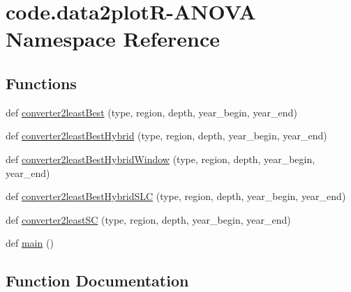 \hypertarget{namespacecode_1_1data2plot_r-_a_n_o_v_a}{}\section{code.\+data2plotR-\/\+A\+N\+O\+VA Namespace Reference}
\label{namespacecode_1_1data2plot_r-_a_n_o_v_a}
\subsection*{Functions}
\begin{DoxyCompactItemize}
\item 
def \hyperlink{namespacecode_1_1data2plot_r-_a_n_o_v_a_a676b780f7bdfac506bee0664f06a2784}{converter2least\+Best} (type, region, depth, year\+\_\+begin, year\+\_\+end)
\item 
def \hyperlink{namespacecode_1_1data2plot_r-_a_n_o_v_a_a4f3a91933b5b3a758ce08d78f87c6bf6}{converter2least\+Best\+Hybrid} (type, region, depth, year\+\_\+begin, year\+\_\+end)
\item 
def \hyperlink{namespacecode_1_1data2plot_r-_a_n_o_v_a_a4c41130d0551498496f6a504dc116760}{converter2least\+Best\+Hybrid\+Window} (type, region, depth, year\+\_\+begin, year\+\_\+end)
\item 
def \hyperlink{namespacecode_1_1data2plot_r-_a_n_o_v_a_a21a63b5181bb7ee4861caecb14fbce54}{converter2least\+Best\+Hybrid\+S\+LC} (type, region, depth, year\+\_\+begin, year\+\_\+end)
\item 
def \hyperlink{namespacecode_1_1data2plot_r-_a_n_o_v_a_a06e015f60ef6222c28908514b28475d3}{converter2least\+SC} (type, region, depth, year\+\_\+begin, year\+\_\+end)
\item 
def \hyperlink{namespacecode_1_1data2plot_r-_a_n_o_v_a_a2572fd7384cf554d3dcd85d348638326}{main} ()
\end{DoxyCompactItemize}


\subsection{Function Documentation}
\mbox{\label{namespacecode_1_1data2plot_r-_a_n_o_v_a_a676b780f7bdfac506bee0664f06a2784}} 
